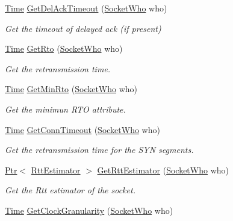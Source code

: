 \begin{DoxyCompactItemize}
\hyperlink{classns3_1_1Time}{Time} \hyperlink{classns3_1_1TcpGeneralTest_a85ab64b9eaad84435c0b30b96a3a64aa}{Get\+Del\+Ack\+Timeout} (\hyperlink{classns3_1_1TcpGeneralTest_a29338e6b7137cad650c2ff835713f6ee}{Socket\+Who} who)
\begin{DoxyCompactList}\small\item\em Get the timeout of delayed ack (if present) \end{DoxyCompactList}\item 
\hyperlink{classns3_1_1Time}{Time} \hyperlink{classns3_1_1TcpGeneralTest_a9e657804bde27d35cfd99186e25f6145}{Get\+Rto} (\hyperlink{classns3_1_1TcpGeneralTest_a29338e6b7137cad650c2ff835713f6ee}{Socket\+Who} who)
\begin{DoxyCompactList}\small\item\em Get the retransmission time. \end{DoxyCompactList}\item 
\hyperlink{classns3_1_1Time}{Time} \hyperlink{classns3_1_1TcpGeneralTest_a3e84cd4e8c38a2fe6077fcbf26ec729e}{Get\+Min\+Rto} (\hyperlink{classns3_1_1TcpGeneralTest_a29338e6b7137cad650c2ff835713f6ee}{Socket\+Who} who)
\begin{DoxyCompactList}\small\item\em Get the minimun R\+TO attribute. \end{DoxyCompactList}\item 
\hyperlink{classns3_1_1Time}{Time} \hyperlink{classns3_1_1TcpGeneralTest_a9e834d14ecf4e277fddee020f33b944a}{Get\+Conn\+Timeout} (\hyperlink{classns3_1_1TcpGeneralTest_a29338e6b7137cad650c2ff835713f6ee}{Socket\+Who} who)
\begin{DoxyCompactList}\small\item\em Get the retransmission time for the S\+YN segments. \end{DoxyCompactList}\item 
\hyperlink{classns3_1_1Ptr}{Ptr}$<$ \hyperlink{classns3_1_1RttEstimator}{Rtt\+Estimator} $>$ \hyperlink{classns3_1_1TcpGeneralTest_a046965a7dd34cdb77c1403a3fb55ba54}{Get\+Rtt\+Estimator} (\hyperlink{classns3_1_1TcpGeneralTest_a29338e6b7137cad650c2ff835713f6ee}{Socket\+Who} who)
\begin{DoxyCompactList}\small\item\em Get the Rtt estimator of the socket. \end{DoxyCompactList}\item 
\hyperlink{classns3_1_1Time}{Time} \hyperlink{classns3_1_1TcpGeneralTest_a8e63caf6d2424c2523ae996a545f2c9c}{Get\+Clock\+Granularity} (\hyperlink{classns3_1_1TcpGeneralTest_a29338e6b7137cad650c2ff835713f6ee}{Socket\+Who} who)

\end{DoxyCompactItemize}

